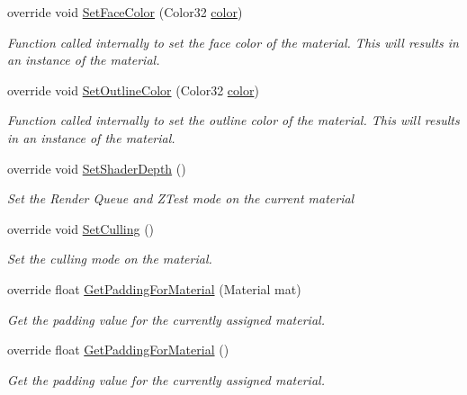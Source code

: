 \begin{DoxyCompactItemize}
override void \mbox{\hyperlink{class_t_m_pro_1_1_text_mesh_pro_u_g_u_i_ab485c4e2bf309a9485360a19de950fa2}{Set\+Face\+Color}} (Color32 \mbox{\hyperlink{class_t_m_pro_1_1_t_m_p___text_af874b3b1f2d1565c68e0c3ad9f79e5c4}{color}})
\begin{DoxyCompactList}\small\item\em Function called internally to set the face color of the material. This will results in an instance of the material. \end{DoxyCompactList}\item 
override void \mbox{\hyperlink{class_t_m_pro_1_1_text_mesh_pro_u_g_u_i_ab6bfded8873a3c3aea4639932ec6f4b7}{Set\+Outline\+Color}} (Color32 \mbox{\hyperlink{class_t_m_pro_1_1_t_m_p___text_af874b3b1f2d1565c68e0c3ad9f79e5c4}{color}})
\begin{DoxyCompactList}\small\item\em Function called internally to set the outline color of the material. This will results in an instance of the material. \end{DoxyCompactList}\item 
override void \mbox{\hyperlink{class_t_m_pro_1_1_text_mesh_pro_u_g_u_i_a764d47b0d54909e0e981e6ab50e95191}{Set\+Shader\+Depth}} ()
\begin{DoxyCompactList}\small\item\em Set the Render Queue and Z\+Test mode on the current material \end{DoxyCompactList}\item 
override void \mbox{\hyperlink{class_t_m_pro_1_1_text_mesh_pro_u_g_u_i_a1042bb0fdc0289c8d159570b9ee3bb5e}{Set\+Culling}} ()
\begin{DoxyCompactList}\small\item\em Set the culling mode on the material. \end{DoxyCompactList}\item 
override float \mbox{\hyperlink{class_t_m_pro_1_1_text_mesh_pro_u_g_u_i_a69bc3c5189896bbde641deefb4b76592}{Get\+Padding\+For\+Material}} (Material mat)
\begin{DoxyCompactList}\small\item\em Get the padding value for the currently assigned material. \end{DoxyCompactList}\item 
override float \mbox{\hyperlink{class_t_m_pro_1_1_text_mesh_pro_u_g_u_i_ae9871315cb95b1211de6c61f7500947b}{Get\+Padding\+For\+Material}} ()
\begin{DoxyCompactList}\small\item\em Get the padding value for the currently assigned material. \end{DoxyCompactList}\item 

\end{DoxyCompactItemize}
